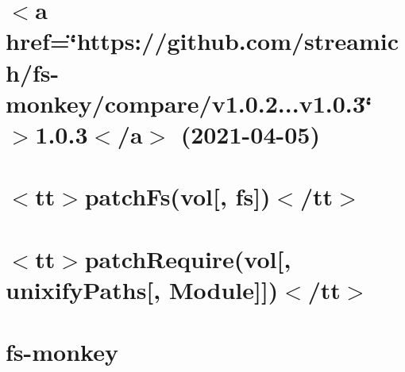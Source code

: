 \documentclass[twoside]{book}
\newcommand{\+}{\discretionary{\mbox{\scriptsize$\hookleftarrow$}}{}{}}
\begin{document}
\chapter{\texorpdfstring{$<$}{<}a href=\char`\"{}https\+://github.\+com/streamich/fs-\/monkey/compare/v1.\+0.\+2...\+v1.\+0.\+3\char`\"{} \texorpdfstring{$>$}{>}1.0.3\texorpdfstring{$<$}{<}/a\texorpdfstring{$>$}{>} (2021-\/04-\/05)}
\label{md__c___users_vaishnavi_jadhav__desktop__developer_code_mean_stack_example_client_node_modules_fs_monkey__c_h_a_n_g_e_l_o_g}

\chapter{\texorpdfstring{$<$}{<}tt\texorpdfstring{$>$}{>}patch\+Fs(vol\mbox{[}, fs\mbox{]})\texorpdfstring{$<$}{<}/tt\texorpdfstring{$>$}{>}}
\label{md__c___users_vaishnavi_jadhav__desktop__developer_code_mean_stack_example_client_node_modules_fs_monkey_docs_api_patch_fs}

\chapter{\texorpdfstring{$<$}{<}tt\texorpdfstring{$>$}{>}patch\+Require(vol\mbox{[}, unixify\+Paths\mbox{[}, Module\mbox{]}\mbox{]})\texorpdfstring{$<$}{<}/tt\texorpdfstring{$>$}{>}}
\label{md__c___users_vaishnavi_jadhav__desktop__developer_code_mean_stack_example_client_node_modules_fs_monkey_docs_api_patch_require}

\chapter{fs-\/monkey}
\label{md__c___users_vaishnavi_jadhav__desktop__developer_code_mean_stack_example_client_node_modules_fs_monkey__r_e_a_d_m_e}

\end{document}
